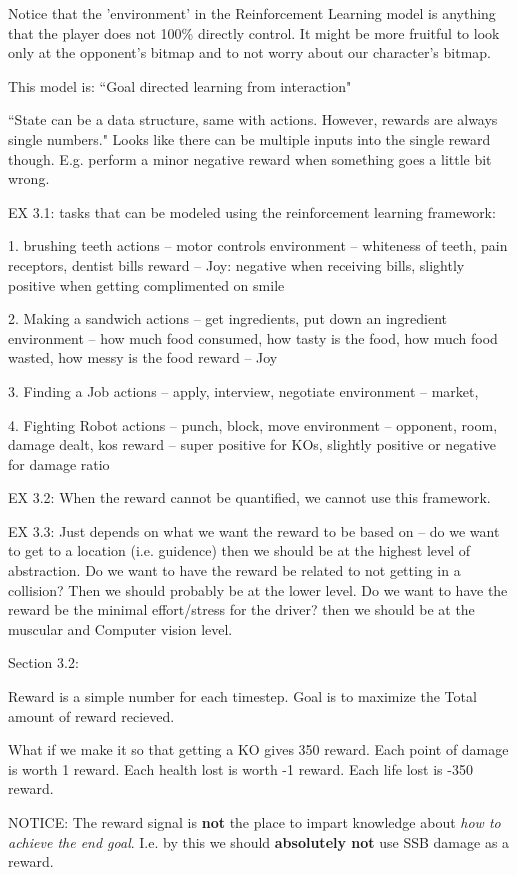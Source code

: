 Notice that the 'environment' in the Reinforcement Learning model is anything that the player does not 100\% directly control.
It might be more fruitful to look only at the opponent's bitmap and to not worry about our character's bitmap.

This model is: ``Goal directed learning from interaction"

``State can be a data structure, same with actions. However, rewards are always single numbers."
Looks like there can be multiple inputs into the single reward though.
E.g. perform a minor negative reward when something goes a little bit wrong.

EX 3.1:
tasks that can be modeled using the reinforcement learning framework:

1. brushing teeth
actions -- motor controls
environment -- whiteness of teeth, pain receptors, dentist bills
reward -- Joy: negative when receiving bills, slightly positive when getting complimented on smile

2. Making a sandwich
actions -- get ingredients, put down an ingredient
environment -- how much food consumed, how tasty is the food, how much food wasted, how messy is the food
reward -- Joy

3. Finding a Job
actions -- apply, interview, negotiate
environment -- market, 

4. Fighting Robot
actions -- punch, block, move
environment -- opponent, room, damage dealt, kos
reward -- super positive for KOs, slightly positive or negative for damage ratio

EX 3.2:
When the reward cannot be quantified, we cannot use this framework.

EX 3.3:
Just depends on what we want the reward to be based on -- do we want to get to a location (i.e. guidence) then we should be at the highest level of abstraction.
Do we want to have the reward be related to not getting in a collision? Then we should probably be at the lower level.
Do we want to have the reward be the minimal effort/stress for the driver? then we should be at the muscular and Computer vision level.


Section 3.2:

Reward is a simple number for each timestep.
Goal is to maximize the Total amount of reward recieved.

What if we make it so that getting a KO gives 350 reward.
Each point of damage is worth 1 reward.
Each health lost is worth -1 reward.
Each life lost is -350 reward.

NOTICE: The reward signal is \textbf{not} the place to impart knowledge about \textit{how to achieve the end goal}.
I.e. by this we should \textbf{absolutely not} use SSB damage as a reward.

